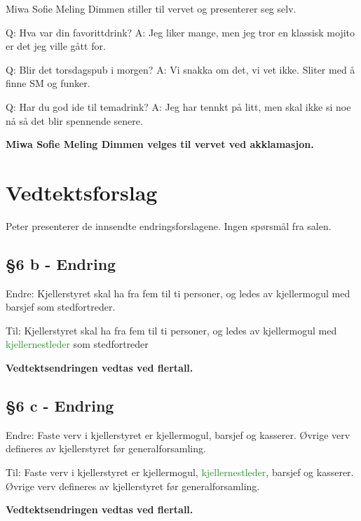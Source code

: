 \documentclass[10pt,norsk,a4paper,usenames,dvipsnames]{article}
\begin{document}
\begin{multicols}{2}
             Miwa Sofie Meling Dimmen stiller til vervet og presenterer seg selv.


             Q: Hva var din favorittdrink?
             A: Jeg liker mange, men jeg tror en klassisk mojito er det jeg ville gått for.

             Q: Blir det torsdagspub i morgen?
             A: Vi snakka om det, vi vet ikke. Sliter med å finne SM og funker.

             Q: Har du god ide til temadrink?
             A: Jeg har tennkt på litt, men skal ikke si noe nå så det blir spennende senere.

\textbf{             Miwa Sofie Meling Dimmen velges til vervet ved akklamasjon.
}



\end{multicols}

\section{Vedtektsforslag}

     Peter presenterer de innsendte endringsforslagene. Ingen spørsmål fra salen.


    \subsection{§6 b - Endring}
    Endre:
    Kjellerstyret skal ha fra fem til ti personer, og ledes av kjellermogul med \textcolor{BrickRed}{barsjef} som stedfortreder.

    Til:
    Kjellerstyret skal ha fra fem til ti personer, og ledes av kjellermogul med \textcolor{ForestGreen}{kjellernestleder} som stedfortreder

    \textbf{Vedtektsendringen vedtas ved flertall.}


    \subsection{§6 c - Endring}
    Endre:
    Faste verv i kjellerstyret er kjellermogul, barsjef og kasserer. Øvrige verv defineres av kjellerstyret før generalforsamling.

    Til:
    Faste verv i kjellerstyret er kjellermogul, \textcolor{ForestGreen}{kjellernestleder}, barsjef og kasserer. Øvrige verv defineres av kjellerstyret før generalforsamling.

    \textbf{Vedtektsendringen vedtas ved flertall.}
\end{document}
